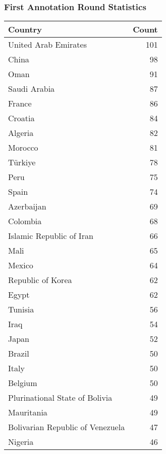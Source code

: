 {
\onecolumn
\subsubsection{First Annotation Round Statistics}
\label{appendix:sec:sivqa:anno:first_round}
%
\begin{table}[ht!]
    \centering
    \begin{minipage}[t]{0.50\textwidth}
        \scriptsize
        \centering
        \begin{tabular}{lr}
            \toprule
            Country & Count \\
            \midrule
            United Arab Emirates & 101 \\
            China & 98 \\
            Oman & 91 \\
            Saudi Arabia & 87 \\
            France & 86 \\
            Croatia & 84 \\
            Algeria & 82 \\
            Morocco & 81 \\
            Türkiye & 78 \\
            Peru & 75 \\
            Spain & 74 \\
            Azerbaijan & 69 \\
            Colombia & 68 \\
            Islamic Republic of Iran & 66 \\
            Mali & 65 \\
            Mexico & 64 \\
            Republic of Korea & 62 \\
            Egypt & 62 \\
            Tunisia & 56 \\
            Iraq & 54 \\
            Japan & 52 \\
            Brazil & 50 \\
            Italy & 50 \\
            Belgium & 50 \\
            Plurinational State of Bolivia & 49 \\
            Mauritania & 49 \\
            Bolivarian Republic of Venezuela & 47 \\
            Nigeria & 46 \\

\end{tabular}
\end{minipage}
\end{table}}
